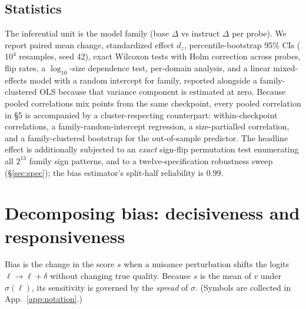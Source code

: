 \documentclass[11pt]{article}
\begin{document}
\subsection{Statistics}
The inferential unit is the model family (base $\Delta$ vs instruct $\Delta$ per
probe). We report paired mean change, standardized effect $d_z$, percentile-bootstrap
95\% CIs ($10^4$ resamples, seed 42), exact Wilcoxon tests with Holm correction across
probes, flip rates, a $\log_{10}$-size dependence test, per-domain analysis, and a
linear mixed-effects model with a random intercept for family, reported alongside a
family-clustered OLS because that variance component is estimated at zero. Because pooled
correlations mix points from the same checkpoint, every pooled correlation in \S5 is
accompanied by a cluster-respecting counterpart: within-checkpoint correlations, a
family-random-intercept regression, a size-partialled correlation, and a
family-clustered bootstrap for the out-of-sample predictor. The headline effect is
additionally subjected to an \emph{exact} sign-flip permutation test enumerating all
$2^{13}$ family sign patterns, and to a twelve-specification robustness sweep
(\S\ref{sec:spec}); the bias estimator's split-half reliability is $0.99$.

\section{Decomposing bias: decisiveness and responsiveness}\label{sec:theory}
Bias is the change in the score $s$ when a nuisance perturbation shifts the logits
$\ell \to \ell + \delta$ without changing true quality. Because $s$ is the mean of
$v$ under $\sigma(\ell)$, its sensitivity is governed by the \emph{spread} of
$\sigma$. (Symbols are collected in App.~\ref{app:notation}.)
\end{document}
